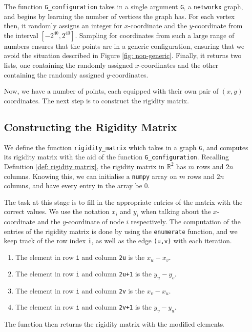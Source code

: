 \begin{flushleft}
The function \texttt{G\_configuration} takes in a single argument \texttt{G}, a \texttt{networkx} graph, and begins by learning the number of vertices the graph has. For each vertex then, it randomly assigns an integer for $x$-coordinate and the $y$-coordinate from the interval $[-2^{40}, 2^{40}]$. 
Sampling for coordinates from such a large range of numbers ensures that the points are in a generic configuration, ensuring that we avoid the situation described in Figure \ref{fig: non-generic}. Finally, it returns two lists, one containing the randomly assigned $x$-coordinates and the other containing the randomly assigned $y$-coordinates.
\end{flushleft}

\begin{flushleft}
Now, we have a number of points, each equipped with their own pair of $(x,y)$ coordinates. The next step is to construct the rigidity matrix.
\end{flushleft}

\subsection{Constructing the Rigidity Matrix}

\begin{flushleft}
We define the function \texttt{rigidity\_matrix} which takes in a graph \texttt{G}, and computes its rigidity matrix with the aid of the function \texttt{G\_configuration}. Recalling Definition \ref{def: rigidity matrix}, the rigidity matrix in $\mathbb{R}^2$ has $m$ rows and $2n$ columns. Knowing this, we can initialise a \texttt{numpy} array on $m$ rows and $2n$ columns, and have every entry in the array be 0.
\end{flushleft}

\begin{flushleft}
The task at this stage is to fill in the appropriate entries of the matrix with the correct values. We use the notation $x_i$ and $y_i$ when talking about the $x$-coordinate and the $y$-coordinate of node $i$ respectively. The computation of the entries of the rigidity matrix is done by using the \texttt{enumerate} function, and we keep track of the row index \texttt{i}, as well as the edge \texttt{(u,v)} with each iteration.
\begin{enumerate}
    \item The element in row \texttt{i} and column \texttt{2u} is the $x_u - x_v$.
    \vspace{-3mm}
    \item The element in row \texttt{i} and column \texttt{2u+1} is the $y_u - y_v$.
    \vspace{-3mm}
    \item The element in row \texttt{i} and column \texttt{2v} is the $x_v - x_u$.
    \vspace{-3mm}
    \item The element in row \texttt{i} and column \texttt{2v+1} is the $y_v - y_u$.
\end{enumerate}
The function then returns the rigidity matrix with the modified elements. 
\end{flushleft}

